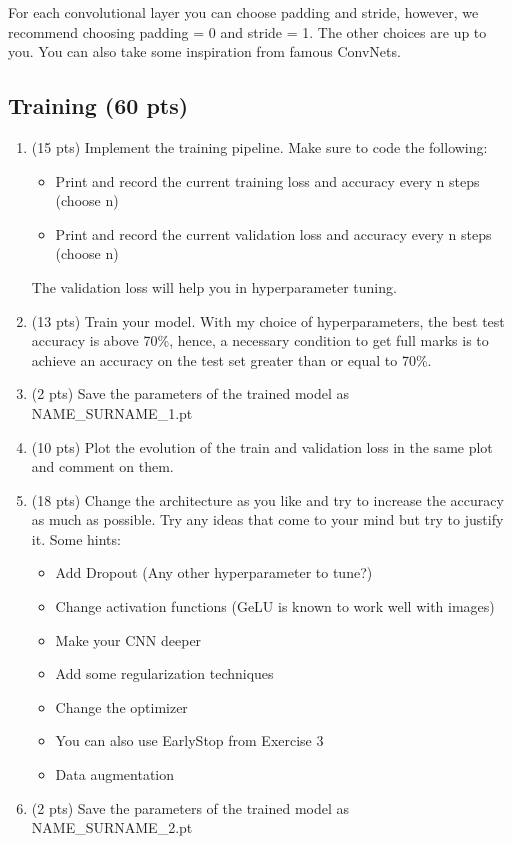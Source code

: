 \documentclass[a4paper]{article}
\begin{document}
For each convolutional layer you can choose padding and stride, however, we recommend choosing padding = 0 and stride = 1. The other choices are up to you. You can also take some inspiration from famous ConvNets.

\subsection{Training (60 pts)}
\begin{enumerate}
    \item (15 pts) Implement the training pipeline. Make sure to code the following:
    \begin{itemize}
        \item Print and record the current training loss and accuracy every n steps (choose n)
        \item Print and record the current validation loss and accuracy every n steps (choose n)
    \end{itemize}
    The validation loss will help you in hyperparameter tuning.
    
    \item (13 pts) Train your model. With my choice of hyperparameters, the best test accuracy is above 70\%, hence, a necessary condition to get full marks is to achieve an accuracy on the test set greater than or equal to 70\%.
    
    \item (2 pts) Save the parameters of the trained model as NAME\_SURNAME\_1.pt
    
    \item (10 pts) Plot the evolution of the train and validation loss in the same plot and comment on them.
    
    \item (18 pts) Change the architecture as you like and try to increase the accuracy as much as possible. Try any ideas that come to your mind but try to justify it. Some hints:
    \begin{itemize}
        \item Add Dropout (Any other hyperparameter to tune?)
        \item Change activation functions (GeLU is known to work well with images)
        \item Make your CNN deeper
        \item Add some regularization techniques
        \item Change the optimizer
        \item You can also use EarlyStop from Exercise 3
        \item Data augmentation
    \end{itemize} 
    \item (2 pts) Save the parameters of the trained model as NAME\_SURNAME\_2.pt
\end{enumerate}
\end{document}
